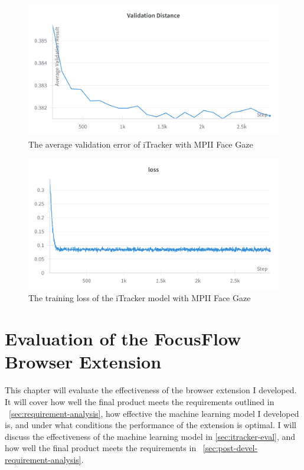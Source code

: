 \documentclass{report}
\begin{document}
\begin{figure}
    \begin{center}
        \includegraphics[scale=0.1]{../assets/Validation Distance.png}
    \end{center}
    \caption{The average validation error of iTracker with MPII Face Gaze}
    \label{fig:loss}
\end{figure}

\begin{figure}
    \begin{center}
        \includegraphics[scale=0.1]{../assets/Training Loss.png}
    \end{center}
    \caption{The training loss of the iTracker model with MPII Face Gaze}
    \label{fig:val}
\end{figure}


\chapter{Evaluation of the FocusFlow Browser Extension}
\label{chap:results}

This chapter will evaluate the effectiveness of the browser extension I developed. It will cover how well the final product meets the requirements outlined in ~\autoref{sec:requirement-analysis}, how effective the machine learning model I developed is, and under what conditions the performance of the extension is optimal. I will discuss the effectiveness of the machine learning model in \autoref{sec:itracker-eval}, and how well the final product meets the requirements in ~\autoref{sec:post-devel-requirement-analysis}.
\end{document}
